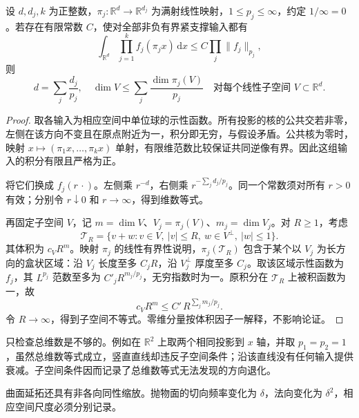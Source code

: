 \begin{proposition}[投影积分的维数必要条件]\label{b2:prop:25-dimension-necessary}
设 \(d,d_j,k\) 为正整数，\(\pi_j:\mathbb R^d\to\mathbb R^{d_j}\) 为满射线性映射，\(1\leq p_j\leq\infty\)，约定 \(1/\infty=0\)。若存在有限常数 \(C\)，使对全部非负有界紧支撑输入都有
\[
 \int_{\mathbb R^d}\prod_{j=1}^k f_j(\pi_jx)\,\mathrm dx
 \leq C\prod_j\|f_j\|_{p_j},
\]
则
\[
 d=\sum_j\frac{d_j}{p_j},
 \quad
 \dim V\leq\sum_j\frac{\dim\pi_j(V)}{p_j}
 \quad\text{对每个线性子空间 }V\subset\mathbb R^d.
\]
\end{proposition}
\begin{proof}
取各输入为相应空间中单位球的示性函数。所有投影的核的公共交若非零，左侧在该方向不变且在原点附近为一，积分即无穷，与假设矛盾。公共核为零时，映射 \(x\mapsto(\pi_1x,\ldots,\pi_kx)\) 单射，有限维范数比较保证共同逆像有界。因此这组输入的积分有限且严格为正。

将它们换成 \(f_j(r\,\cdot)\)。左侧乘 \(r^{-d}\)，右侧乘 \(r^{-\sum_jd_j/p_j}\)。同一个常数须对所有 \(r>0\) 有效；分别令 \(r\downarrow0\) 和 \(r\to\infty\)，得到维数等式。

再固定子空间 \(V\)，记 \(m=\dim V\)、\(V_j=\pi_j(V)\)、\(m_j=\dim V_j\)。对 \(R\geq1\)，考虑
\[
 \mathcal T_R=\{v+w:v\in V,\ |v|\leq R,\ 
                      w\in V^\perp,\ |w|\leq1\}.
\]
其体积为 \(c_VR^m\)。映射 \(\pi_j\) 的线性有界性说明，\(\pi_j(\mathcal T_R)\) 包含于某个以 \(V_j\) 为长方向的盒状区域：沿 \(V_j\) 长度至多 \(C_jR\)，沿 \(V_j^\perp\) 厚度至多 \(C_j\)。取该区域示性函数为 \(f_j\)，其 \(L^{p_j}\) 范数至多为 \(C'_jR^{m_j/p_j}\)，无穷指数时为一。原积分在 \(\mathcal T_R\) 上被积函数为一，故
\[
 c_VR^m\leq C'\,R^{\sum_jm_j/p_j}.
\]
令 \(R\to\infty\)，得到子空间不等式。零维分量按体积因子一解释，不影响论证。
\end{proof}

只检查总维数是不够的。例如在 \(\mathbb R^2\) 上取两个相同投影到 \(x\) 轴，并取 \(p_1=p_2=1\)，虽然总维数等式成立，竖直直线却违反子空间条件；沿该直线没有任何输入提供衰减。子空间条件因而记录了总维数等式无法发现的方向退化。

\ProseParagraphBreak

曲面延拓还具有非各向同性缩放。抛物面的切向频率变化为 \(\delta\)，法向变化为 \(\delta^2\)，相应空间尺度必须分别记录。

